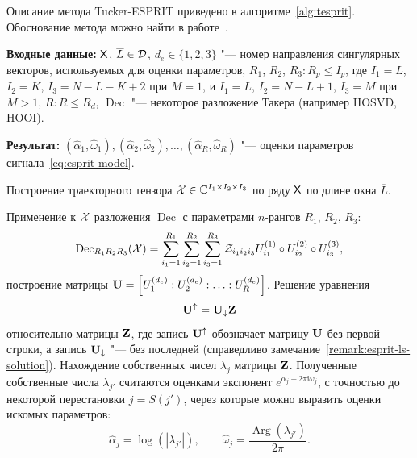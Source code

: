 \documentclass[specialist,
  substylefile = spbu.rtx,
subf,href,colorlinks=true, 12pt]{disser}
\theoremstyle{plain}
\theoremstyle{definition}
\theoremstyle{remark}
\newcommand{\Input}{\textbf{Входные данные: }}
\newcommand{\Output}{\textbf{Результат: }}
\newcommand{\iu}{\mathrm{i}}
\def\tesprit/{Tucker-ESPRIT}
\begin{document}
Описание метода \tesprit/ приведено в алгоритме~\ref{alg:tesprit}.
Обоснование метода можно найти в работе~\cite{hosvd-hooi-separation}.
\begin{algorithm}[!ht]
  \caption{\tesprit/ для оценки параметров комплекснозначного сигнала.}
  \label{alg:tesprit}
  \Input $\mathsf{X}$, $\overline{L} \in \mathcal{D}$,
  $d_e\in \{1, 2, 3\}$ "--- номер направления сингулярных векторов,
  используемых для оценки параметров,
  $R_1$, $R_2$, $R_3: R_p \leqslant I_p$, где
  $I_1=L$, $I_2=K$, $I_3=N-L-K+2$ при $M=1$, и
  $I_1=L$, $I_2=N-L+1$, $I_3=M$ при $M >1$,
  $R: R\leqslant R_d$, $\operatorname{Dec}$ "--- некоторое разложение
  Такера (например HOSVD, HOOI).

  \Output $\left(\widehat{\alpha}_1, \widehat{\omega}_1\right),
  \left(\widehat{\alpha}_2, \widehat{\omega}_2\right), \ldots,
  \left(\widehat{\alpha}_R, \widehat{\omega}_R\right)$ "---
  оценки параметров
  сигнала~\eqref{eq:esprit-model}.
  \begin{algorithmic}[1]
    \State Построение траекторного тензора $\mathcal{X}\in \mathbb{C}^{I_1\times
    I_2 \times I_3}$
    по ряду $\mathsf{X}$ по длине окна $\overline{L}$.

    \State Применение к $\mathcal{X}$ разложения $\operatorname{Dec}$ с
    параметрами $n$-рангов $R_1,\, R_2,\, R_3$:
    \[
      \operatorname{Dec}_{R_1R_2R_3}(\mathcal{X}) =
      \sum_{i_1=1}^{R_1} \sum_{i_2=1}^{R_2}
      \sum_{i_3=1}^{R_3}
      \mathcal{Z}_{i_1 i_2 i_3} U_{i_1}^{(1)}\circ U_{i_2}^{(2)} \circ
      U_{i_3}^{(3)},
    \]
    построение матрицы $\mathbf{U} = \left[U_1^{(d_e)}:U_2^{(d_e)}:\ldots:
    U_{R}^{(d_e)}\right]$.
    \State Решение уравнения
    \[
      \mathbf{U}^{\uparrow}=\mathbf{U}_{\downarrow}\mathbf{Z}
    \]
    относительно матрицы $\mathbf{Z}$, где запись $\mathbf{U}^{\uparrow}$
    обозначает матрицу $\mathbf{U}$ без первой строки,
    а запись $\mathbf{U}_{\downarrow}$ "--- без последней (справедливо
    замечание~\ref{remark:esprit-ls-solution}).
    \State Нахождение собственных
    чисел $\lambda_j$ матрицы $\mathbf{Z}$.
    Полученные собственные числа $\lambda_{j'}$ считаются оценками
    экспонент $e^{\alpha_j + 2\pi\iu \omega_j}$, с точностью
    до некоторой перестановки
    $j = S (j')$, через которые можно выразить
    оценки искомых параметров:
    \[
      \widehat{\alpha}_j =
      \log\left(\left|\lambda_{j'}\right|\right), \qquad
      \widehat{\omega}_j =
      \frac{\operatorname{Arg}\left(\lambda_{j'}\right)}{2 \pi}.
    \]
  \end{algorithmic}
\end{algorithm}
\end{document}
